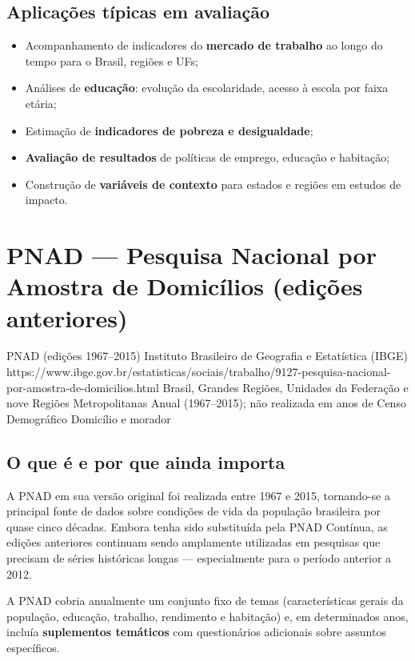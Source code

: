 \subsection{Aplicações típicas em avaliação}

\begin{itemize}
  \item Acompanhamento de indicadores do \textbf{mercado de trabalho} ao longo do tempo para o Brasil, regiões e UFs;
  \item Análises de \textbf{educação}: evolução da escolaridade, acesso à escola por faixa etária;
  \item Estimação de \textbf{indicadores de pobreza e desigualdade};
  \item \textbf{Avaliação de resultados} de políticas de emprego, educação e habitação;
  \item Construção de \textbf{variáveis de contexto} para estados e regiões em estudos de impacto.
\end{itemize}

\section{PNAD --- Pesquisa Nacional por Amostra de Domicílios
         (edições anteriores)}

\ficharapida
  {PNAD (edições 1967--2015)}
  {Instituto Brasileiro de Geografia e Estatística (IBGE)}
  {https://www.ibge.gov.br/estatisticas/sociais/trabalho/9127-pesquisa-nacional-por-amostra-de-domicilios.html}
  {Brasil, Grandes Regiões, Unidades da Federação e nove Regiões Metropolitanas}
  {Anual (1967--2015); não realizada em anos de Censo Demográfico}
  {Domicílio e morador}

\subsection{O que é e por que ainda importa}

A PNAD em sua versão original foi realizada entre 1967 e 2015, tornando-se a principal fonte de dados sobre condições de vida da população brasileira por quase cinco décadas. Embora tenha sido substituída pela PNAD Contínua, as edições anteriores continuam sendo amplamente utilizadas em pesquisas que precisam de séries históricas longas --- especialmente para o período anterior a 2012.

A PNAD cobria anualmente um conjunto fixo de temas (características gerais da população, educação, trabalho, rendimento e habitação) e, em determinados anos, incluía \textbf{suplementos temáticos} com questionários adicionais sobre assuntos específicos.

